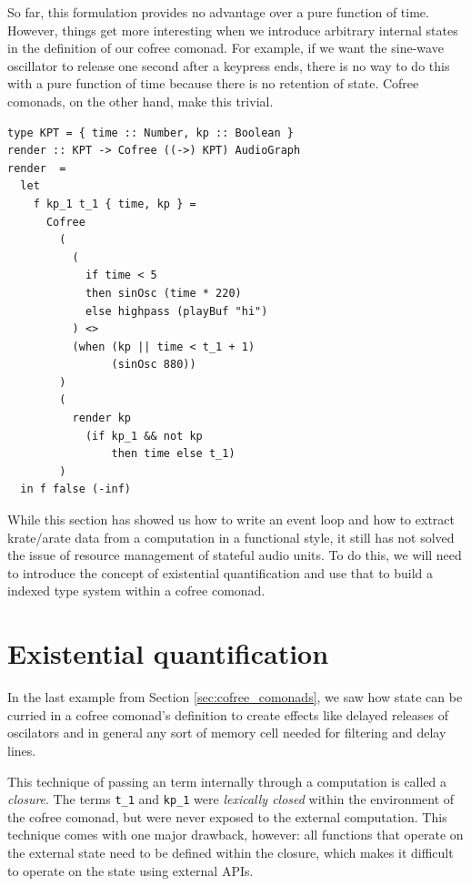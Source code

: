 \documentclass{article}
\begin{document}
So far, this formulation provides no advantage over a pure function of time. However, things get more interesting when we introduce arbitrary internal states in the definition of our cofree comonad. For example, if we want the sine-wave oscillator to release one second after a keypress ends, there is no way to do this with a pure function of time because there is no retention of state. Cofree comonads, on the other hand, make this trivial.

\lstset{language=Haskell, style=psstyle}
\begin{lstlisting}
type KPT = { time :: Number, kp :: Boolean }
render :: KPT -> Cofree ((->) KPT) AudioGraph
render  =
  let
    f kp_1 t_1 { time, kp } =
      Cofree
        (
          (
            if time < 5
            then sinOsc (time * 220)
            else highpass (playBuf "hi")
          ) <>
          (when (kp || time < t_1 + 1)
                (sinOsc 880))
        )
        (
          render kp
            (if kp_1 && not kp
                then time else t_1)
        )
  in f false (-inf)
\end{lstlisting}

While this section has showed us how to write an event loop and how to extract krate/arate data from a computation in a functional style, it still has not solved the issue of resource management of stateful audio units. To do this, we will need to introduce the concept of existential quantification and use that to build a indexed type system within a cofree comonad.

\section{Existential quantification}
\label{sec:existential_quantification}

In the last example from Section \ref{sec:cofree_comonads}, we saw how state can be curried in a cofree comonad's definition to create effects like delayed releases of oscilators and in general any sort of memory cell needed for filtering and delay lines.

This technique of passing an term internally through a computation is called a \textit{closure}. The terms \texttt{t\_1} and \texttt{kp\_1} were \textit{lexically closed} within the environment of the cofree comonad, but were never exposed to the external computation.  This technique comes with one major drawback, however: all functions that operate on the external state need to be defined within the closure, which makes it difficult to operate on the state using external APIs.
\end{document}
